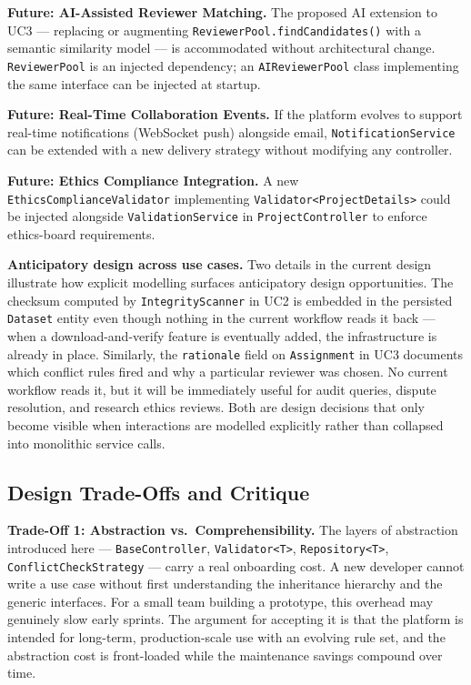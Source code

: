 \documentclass[12pt,a4paper]{article}
\newcommand{\code}[1]{\texttt{\small #1}}
\begin{document}
\noindent\textbf{Future: AI-Assisted Reviewer Matching.}
The proposed AI extension to UC3 --- replacing or augmenting \code{ReviewerPool.findCandidates()} with a semantic similarity model --- is accommodated without architectural change. \code{ReviewerPool} is an injected dependency; an \code{AIReviewerPool} class implementing the same interface can be injected at startup.

\noindent\textbf{Future: Real-Time Collaboration Events.}
If the platform evolves to support real-time notifications (WebSocket push) alongside email, \code{NotificationService} can be extended with a new delivery strategy without modifying any controller.

\noindent\textbf{Future: Ethics Compliance Integration.}
A new \code{EthicsComplianceValidator} implementing \code{Validator<ProjectDetails>} could be injected alongside \code{ValidationService} in \code{ProjectController} to enforce ethics-board requirements.

\noindent\textbf{Anticipatory design across use cases.}
Two details in the current design illustrate how explicit modelling surfaces anticipatory design opportunities. The checksum computed by \code{IntegrityScanner} in UC2 is embedded in the persisted \code{Dataset} entity even though nothing in the current workflow reads it back --- when a download-and-verify feature is eventually added, the infrastructure is already in place. Similarly, the \code{rationale} field on \code{Assignment} in UC3 documents which conflict rules fired and why a particular reviewer was chosen. No current workflow reads it, but it will be immediately useful for audit queries, dispute resolution, and research ethics reviews. Both are design decisions that only become visible when interactions are modelled explicitly rather than collapsed into monolithic service calls.

\subsection{Design Trade-Offs and Critique}

\noindent\textbf{Trade-Off 1: Abstraction vs.\ Comprehensibility.}
The layers of abstraction introduced here --- \code{BaseController}, \code{Validator<T>}, \code{Repository<T>}, \code{ConflictCheckStrategy} --- carry a real onboarding cost. A new developer cannot write a use case without first understanding the inheritance hierarchy and the generic interfaces. For a small team building a prototype, this overhead may genuinely slow early sprints. The argument for accepting it is that the platform is intended for long-term, production-scale use with an evolving rule set, and the abstraction cost is front-loaded while the maintenance savings compound over time.
\end{document}
